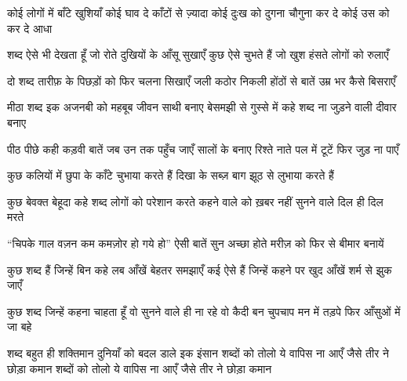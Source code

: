 {{{{{{कोई लोगों में बाँटे खुशियाँ
कोई घाव दे काँटों से ज़्यादा
कोई दुःख को दुगना चौगुना कर दे
कोई उस को कर दे आधा

शब्द ऐसे भी देखता हूँ जो
रोते दुखियों के आँसू सुखाएँ
कुछ ऐसे चुभते हैं जो
खुश हंसते लोगों को रुलाएँ


दो शब्द तारीफ़ के पिछड़ों को
फिर चलना सिखाएँ
जली कठोर निकली होंठों से बातें
उम्र भर कैसे बिसराएँ

मीठा शब्द इक अजनबी को
महबूब जीवन साथी बनाए
बेसमझी से गुस्से में कहे शब्द
ना जुड़ने वाली दीवार बनाए


पीठ पीछे कही कड़वी बातें
जब उन तक पहुँच जाएँ
सालों के बनाए रिश्ते नाते
पल में टूटें फिर जुड़ ना पाएँ

कुछ कलियों में छुपा के
काँटे चुभाया करते हैं
दिखा के सब्ज़ बाग
झूठ से लुभाया करते हैं


कुछ बेवक्त बेहूदा कहे शब्द
लोगों को परेशान करते
कहने वाले को ख़बर नहीं
सुनने वाले दिल ही दिल मरते

“चिपके गाल वज़न कम
कमज़ोर हो गये हो”
ऐसी बातें सुन अच्छा होते
मरीज़ को फिर से बीमार बनायें

कुछ शब्द हैं जिन्हें बिन कहे
लब आँखें बेहतर समझाएँ
कई ऐसे हैं जिन्हें कहने पर
खुद आँखें शर्म से झुक जाएँ

कुछ शब्द जिन्हें कहना चाहता हूँ
वो सुनने वाले ही ना रहे
वो कैदी बन चुपचाप मन में तड़पे
फिर आँसुओं में जा बहे







शब्द बहुत ही शक्तिमान
दुनियाँ को बदल डाले इक इंसान
शब्दों को तोलो ये वापिस ना आएँ
जैसे तीर ने छोड़ा कमान
शब्दों को तोलो ये वापिस ना आएँ
जैसे तीर ने छोड़ा कमान

}}}}}}
